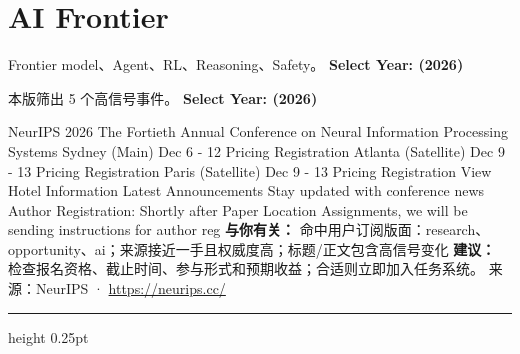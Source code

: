 \documentclass[10.5pt]{ctexart}
\begin{document}
\section*{AI Frontier}
{\color{ormuted} Frontier model、Agent、RL、Reasoning、Safety。}
\vspace{2mm}
{\LARGE\bfseries Select Year: (2026)}\par
\vspace{1mm}
{\color{ormuted} 本版筛出 5 个高信号事件。}
\vspace{3mm}
{\Large\bfseries Select Year: (2026)}\par
NeurIPS 2026 The Fortieth Annual Conference on Neural Information Processing Systems Sydney (Main) Dec 6 - 12 Pricing Registration Atlanta (Satellite) Dec 9 - 13 Pricing Registration Paris (Satellite) Dec 9 - 13 Pricing Registration View Hotel Information Latest Announcements Stay updated with conference news Author Registration: Shortly after Paper Location Assignments, we will be sending instructions for author reg
\textbf{与你有关：} 命中用户订阅版面：research、opportunity、ai；来源接近一手且权威度高；标题/正文包含高信号变化
\textbf{建议：} 检查报名资格、截止时间、参与形式和预期收益；合适则立即加入任务系统。
{\footnotesize\color{ormuted} 来源：NeurIPS · \url{https://neurips.cc/}}
\vspace{4mm}
\hrule height 0.25pt
\vspace{3mm}
\end{document}
